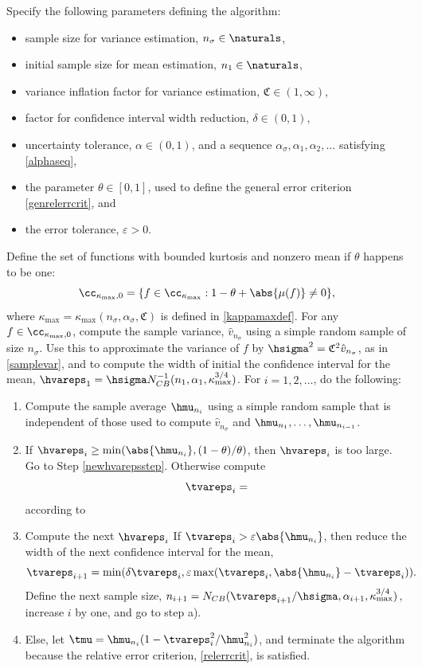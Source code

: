 \documentclass[graybox]{svmult}
\newcommand{\hv}{\hat{v}}
\newcommand{\fudge}{\mathfrak{C}}
\begin{document}
\begin{theorem} \label{relerradaptthm} Specify the following parameters defining the algorithm:
\begin{itemize}
\item sample size for variance estimation, $n_{\sigma} \in \naturals$,
\item initial sample size for mean estimation, $n_1 \in \naturals$,
\item variance inflation factor for variance estimation, $\fudge \in (1,\infty)$, 
\item factor for confidence interval width reduction, $\delta \in (0,1)$,
\item uncertainty tolerance, $\alpha\in (0,1)$, and a sequence $\alpha_{\sigma}, \alpha_1,  \alpha_2, \ldots$ satisfying \eqref{alphaseq}, 
\item the parameter $\theta \in [0,1]$, used to define the general error criterion \eqref{genrelerrcrit}, and
\item the error tolerance, $\varepsilon >0$. 
\end{itemize} 
Define the set of functions with bounded kurtosis and nonzero mean if $\theta$ happens to be one:
\[
\cc_{\kappa_{\max},0}= \{f \in \cc_{\kappa_{\max}} :  1-\theta+\abs{\mu(f)} \ne 0\},
\]
where $\kappa_{\max}=\kappa_{\max}(n_{\sigma},\alpha_{\sigma},\fudge)$ is defined in \eqref{kappamaxdef}.  For any $f \in \cc_{\kappa_{\max},0}$, compute the sample variance, $\hv_{n_{\sigma}}$ using a simple random sample of size $n_{\sigma}$. Use this to approximate the variance of $f$ by $\hsigma^2 = \fudge^2 \hv_{n_{\sigma}}$, as in \eqref{samplevar}, and to compute the width of initial the confidence interval for the mean, $\hvareps_1=\hsigma N_{CB}^{-1}(n_1,\alpha_1,\kappa_{\max}^{3/4})$.  For $i=1, 2, \ldots$, do the following:
\begin{enumerate}
\item Compute the sample average $\hmu_{n_i}$ using a simple random sample that is independent of those used to compute $\hv_{n_{\sigma}}$ and $\hmu_{n_1}, \ldots, \hmu_{n_{i-1}}$.

\item If $\hvareps_i \ge \min(\abs{\hmu_{n_i}},(1-\theta)/\theta)$, then $\hvareps_i$ is too large.  Go to Step \ref{newhvarepsstep}.  Otherwise compute 
\[
\tvareps_i = 
\]
according to 


\item \label{newhvarepsstep} Compute the next $\hvareps_i$
If $\tvareps_i > \varepsilon \abs{\hmu_{n_i}}$, then reduce the width of the next confidence interval for the mean, 
\[
\tvareps_{i+1} = \min(\delta\tvareps_i, \varepsilon \max(\tvareps_i,\abs{\hmu_{n_i}}-\tvareps_i)).
\]
Define the next sample size, $n_{i+1} = N_{CB}(\tvareps_{i+1}/\hsigma,\alpha_{i+1},\kappa_{\max}^{3/4})$,
increase $i$ by one, and go to step a). 

\item Else, let $\tmu = \hmu_{n_i}(1 - \tvareps_i^2/\hmu_{n_i}^2)$, and terminate the algorithm because the relative error criterion, \eqref{relerrcrit}, is satisfied.

\end{enumerate}
\end{theorem}
\end{document}
